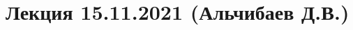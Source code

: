 \documentclass[main.tex]{subfiles}
\begin{document}
\section{Лекция 15.11.2021 (Альчибаев Д.В.)}
\end{document}

